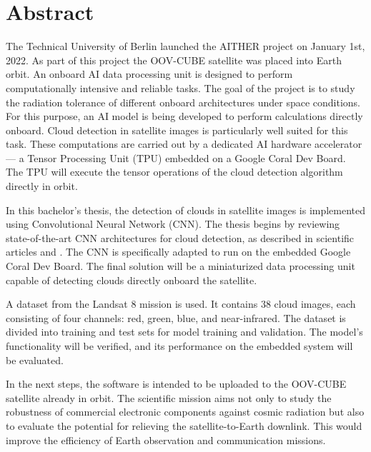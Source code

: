 {\newpage

\section*{Abstract}

The Technical University of Berlin launched the AITHER project on January 1st, 2022. As part of this project the OOV-CUBE satellite was placed into Earth orbit. An onboard AI data processing unit is designed to perform computationally intensive and reliable tasks. The goal of the project is to study the radiation tolerance of different onboard architectures under space conditions. For this purpose, an AI model is being developed to perform calculations directly onboard. Cloud detection in satellite images is particularly well suited for this task. These computations are carried out by a dedicated AI hardware accelerator --- a Tensor Processing Unit (TPU) embedded on a Google Coral Dev Board. The TPU will execute the tensor operations of the cloud detection algorithm directly in orbit.

In this bachelor's thesis, the detection of clouds in satellite images is implemented using Convolutional Neural Network (CNN). The thesis begins by reviewing state-of-the-art CNN architectures for cloud detection, as described in scientific articles \cite{CloudNet2019} and \cite{CloudDet2018}. The CNN is specifically adapted to run on the embedded Google Coral Dev Board. The final solution will be a miniaturized data processing unit capable of detecting clouds directly onboard the satellite.

A dataset from the Landsat 8 mission is used. It contains 38 cloud images, each consisting of four channels: red, green, blue, and near-infrared. The dataset is divided into training and test sets for model training and validation. The model's functionality will be verified, and its performance on the embedded system will be evaluated.

In the next steps, the software is intended to be uploaded to the OOV-CUBE satellite already in orbit. The scientific mission aims not only to study the robustness of commercial electronic components against cosmic radiation but also to evaluate the potential for relieving the satellite-to-Earth downlink. This would improve the efficiency of Earth observation and communication missions.

}